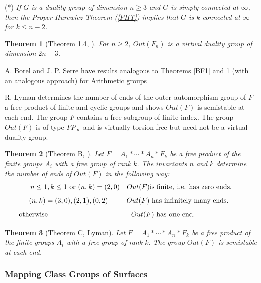 \documentclass[12pt]{article}
\newtheorem{theorem}{Theorem}[subsection]
\begin{document}
\medskip 

\noindent ($\ast$) {\it If $G$ is a duality group of dimension $n\geq 3$ and $G$ is simply connected at $\infty$, then the Proper Hurewicz Theorem (\ref{PHT}) implies that $G$ is $k$-connected at $\infty$ for $k\leq n-2$.} 

\begin{theorem} 
[Theorem 1.4, \cite{BFe00}] \label{BF2}  For $n\geq 2$, $Out(F_n)$ is a virtual duality group of dimension $2n -3$.
\end{theorem}

A. Borel and J. P. Serre have results analogous to Theorems \ref{BF1} and \ref{BF2} (with an analogous approach) for Arithmetic groups \cite{BS73}

R. Lyman determines the number of ends of the outer automorphism group of $F$ a free product of finite and cyclic groups and shows $Out(F)$ is semistable at each end.  The group $F$ contains a free subgroup of finite index. The group $Out(F)$ is of type $FP_{\infty}$ and is virtually torsion free but need not  be a virtual duality group.  

\begin{theorem} [Theorem B, \cite{Lym25}]
Let $F = A_1\ast \cdots \ast A_n\ast F_k$ be a free product of the finite groups $A_i$ with a free group
of rank $k$. The invariants $n$ and $k$ determine the number of ends of $Out(F )$ in the following
way:
$$n \leq 1, k \leq  1 \hbox{ or } (n, k) = (2, 0) \ \ \  Out(F ) \hbox {is finite, i.e. has zero ends}.$$
$$\hskip -.1in (n, k) = (3, 0), (2, 1), (0, 2) \ \ \ \ \ \ \ \ Out(F ) \hbox{ has infinitely many ends.}$$
$$\hskip -1in \hbox{ otherwise }\hskip 1.6in Out(F ) \hbox{ has one end.}$$
\end{theorem}

\begin{theorem} [Theorem C, Lyman] Let $F = A_1\ast \cdots \ast A_n\ast F_k$ be a free product of the finite groups $A_i$ with a free group of rank $k$. The group $Out(F)$ is semistable at each end.
\end{theorem}

\subsubsection{Mapping Class Groups of Surfaces}\label{MCG}
\end{document}
